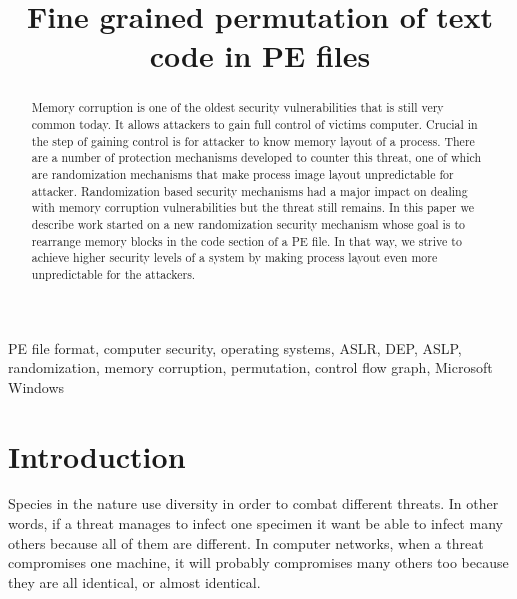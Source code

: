 \documentclass[11pt,final,conference,a4paper]{IEEEtran}
\begin{document}
\IEEEoverridecommandlockouts

\title{Fine grained permutation of text code in PE files}

\author{
	}

\maketitle

\begin{abstract}
Memory corruption is one of the oldest security vulnerabilities
that is still very common today. It allows attackers to gain full
control of victims computer. Crucial in the step of gaining control
is for attacker to know memory layout of a process. There are a
number of protection mechanisms developed to counter this threat,
one of which are randomization mechanisms that make process image
layout unpredictable for attacker. Randomization based security
mechanisms had a major impact on dealing with memory corruption
vulnerabilities but the threat still remains. In this paper we
describe work started on a new randomization security mechanism
whose goal is to rearrange memory blocks in the code section of a
PE file. In that way, we strive to achieve higher security levels
of a system by making process layout even more unpredictable for
the attackers.
\end{abstract}

\begin{keywords}
PE file format, computer security, operating systems, ASLR, DEP, ASLP, randomization, memory corruption, permutation, control flow graph, Microsoft Windows
\end{keywords}

\section{Introduction}
\label{sec:intro}

Species in the nature use diversity in order to combat different
threats. In other words, if a threat manages to infect one specimen
it want be able to infect many others because all of them are
different. In computer networks, when a threat compromises one
machine, it will probably compromises many others too because they
are all identical, or almost identical.
\end{document}
